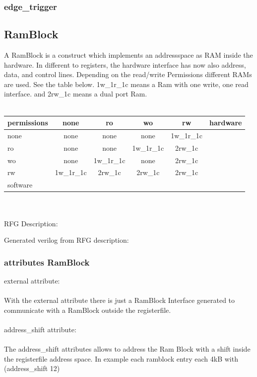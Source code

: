 \documentclass[12pt,a4paper]{article}
\begin{document}
\subsubsection{edge\_trigger}

\subsection{RamBlock}
A RamBlock is a construct which implements an addressspace as RAM inside the hardware. In different to registers, the hardware interface has now also address, data, and control lines. Depending on the read/write Permissions different RAMs are used. See the table below. 1w\_1r\_1c means a Ram with one write, one read interface. and 2rw\_1c means a dual port Ram.\\
\\
\begin{tabular}{ l || c | c | c | c | r }
    permissions & none & ro & wo & rw & hardware\\ \hline\hline
    none & none & none & none & 1w\_1r\_1c \\ \cline{1-5}
    ro & none & none & 1w\_1r\_1c& 2rw\_1c\\ \cline{1-5}
    wo & none & 1w\_1r\_1c& none & 2rw\_1c\\ \cline{1-5}
    rw & 1w\_1r\_1c& 2rw\_1c& 2rw\_1c & 2rw\_1c\\ \cline{1-5}
    software \\
\end{tabular}
\\
\\
RFG Description:
 
\newpage
Generated verilog from RFG description:

\newpage
\subsubsection{attributes RamBlock}
external attribute:\\
\\
With the external attribute there is just a RamBlock Interface generated to communicate with a RamBlock outside the registerfile.\\
\\
address\_shift attribute:\\
\\
The address\_shift attributes allows to address the Ram Block with a shift inside the registerfile address space. In example each ramblock entry each 4kB with (address\_shift 12)
\newpage
\end{document}
